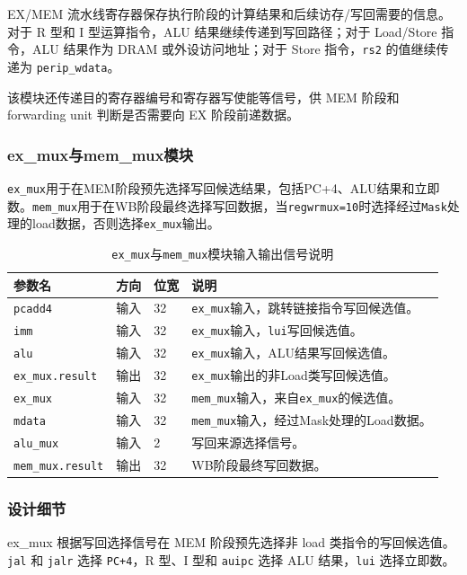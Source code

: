 \documentclass[UTF8,a4paper,12pt]{ctexart}
\newcommand{\code}[1]{\texttt{#1}}
\begin{document}
EX/MEM 流水线寄存器保存执行阶段的计算结果和后续访存/写回需要的信息。对于 R 型和 I 型运算指令，ALU 结果继续传递到写回路径；对于 Load/Store 指令，ALU 结果作为 DRAM 或外设访问地址；对于 Store 指令，\code{rs2} 的值继续传递为 \code{perip\_wdata}。

该模块还传递目的寄存器编号和寄存器写使能等信号，供 MEM 阶段和 forwarding unit 判断是否需要向 EX 阶段前递数据。

\subsubsection{ex\_mux与mem\_mux模块}

\code{ex\_mux}用于在MEM阶段预先选择写回候选结果，包括PC+4、ALU结果和立即数。\code{mem\_mux}用于在WB阶段最终选择写回数据，当\code{regwrmux=10}时选择经过\code{Mask}处理的load数据，否则选择\code{ex\_mux}输出。

\begin{table}[H]
\centering
\caption{\code{ex\_mux}与\code{mem\_mux}模块输入输出信号说明}
\footnotesize
\renewcommand{\arraystretch}{1.15}
\begin{tabularx}{\textwidth}{p{3.2cm}p{1.5cm}p{2.1cm}X}
\toprule
参数名 & 方向 & 位宽 & 说明 \\
\midrule
\code{pcadd4} & 输入 & 32 & \code{ex\_mux}输入，跳转链接指令写回候选值。 \\
\code{imm} & 输入 & 32 & \code{ex\_mux}输入，\code{lui}写回候选值。 \\
\code{alu} & 输入 & 32 & \code{ex\_mux}输入，ALU结果写回候选值。 \\
\code{ex\_mux.result} & 输出 & 32 & \code{ex\_mux}输出的非Load类写回候选值。 \\
\code{ex\_mux} & 输入 & 32 & \code{mem\_mux}输入，来自\code{ex\_mux}的候选值。 \\
\code{mdata} & 输入 & 32 & \code{mem\_mux}输入，经过Mask处理的Load数据。 \\
\code{alu\_mux} & 输入 & 2 & 写回来源选择信号。 \\
\code{mem\_mux.result} & 输出 & 32 & WB阶段最终写回数据。 \\
\bottomrule
\end{tabularx}
\end{table}

\subsubsection*{设计细节}

ex\_mux 根据写回选择信号在 MEM 阶段预先选择非 load 类指令的写回候选值。\code{jal} 和 \code{jalr} 选择 \code{PC+4}，R 型、I 型和 \code{auipc} 选择 ALU 结果，\code{lui} 选择立即数。
\end{document}
